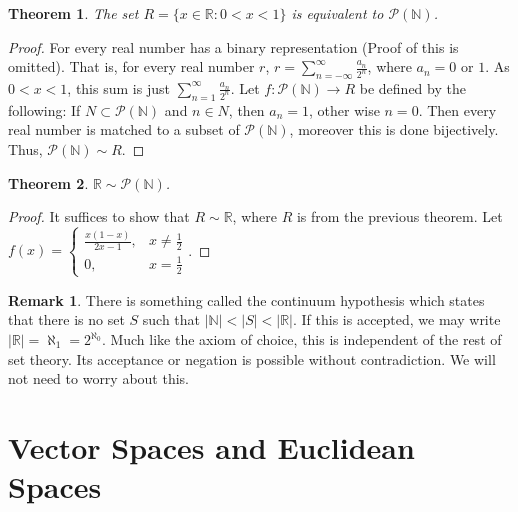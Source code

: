 \documentclass[oneside]{book}
\newtheorem{theorem}{Theorem}[section]
\theoremstyle{definition}
\newtheorem{remark}{Remark}[section]
\begin{document}
\begin{theorem}
The set $R=\{x\in \mathbb{R}:0<x<1\}$ is equivalent to $\mathcal{P}(\mathbb{N})$.
\end{theorem}
\begin{proof}
For every real number has a binary representation (Proof of this is omitted). That is, for every real number $r$, $ r = \sum_{n=-\infty}^{\infty} \frac{a_n}{2^n}$, where $a_n = 0$ or $1$. As $0<x<1$, this sum is just $\sum_{n=1}^{\infty} \frac{a_n}{2^n}$. Let $f:\mathcal{P}(\mathbb{N})\rightarrow R$ be defined by the following: If $N\subset \mathcal{P}(\mathbb{N})$ and $n\in N$, then $a_n = 1$, other wise $n=0$. Then every real number is matched to a subset of $\mathcal{P}(\mathbb{N})$, moreover this is done bijectively. Thus, $\mathcal{P}(\mathbb{N})\sim R$.
\end{proof}

\begin{theorem}
$\mathbb{R} \sim \mathcal{P}(\mathbb{N})$.
\end{theorem}
\begin{proof}
It suffices to show that $R\sim \mathbb{R}$, where $R$ is from the previous theorem. Let $f(x) = \begin{cases} \frac{x(1-x)}{2x-1}, & x \ne \frac{1}{2} \\ 0, & x = \frac{1}{2}\end{cases}$.
\end{proof}

\begin{remark}
There is something called the continuum hypothesis which states that there is no set $S$ such that $|\mathbb{N}| < |S| < |\mathbb{R}|$. If this is accepted, we may write $|\mathbb{R}| = \aleph_1 = 2^{\aleph_0}$. Much like the axiom of choice, this is independent of the rest of set theory. Its acceptance or negation is possible without contradiction. We will not need to worry about this.
\end{remark}

\section{Vector Spaces and Euclidean Spaces}
\end{document}
